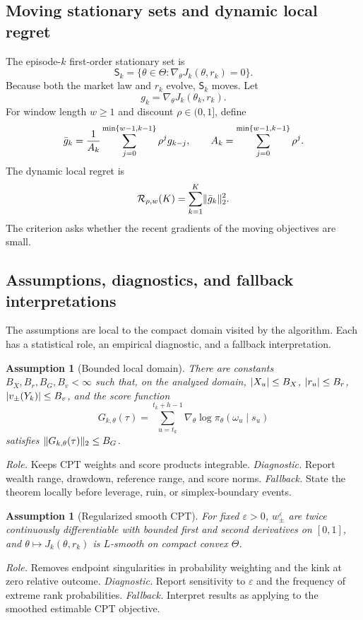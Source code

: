 \documentclass[11pt]{article}
\newtheorem{assumption}[theorem]{Assumption}
\newcommand{\1}{\mathbf 1}
\DeclarePairedDelimiter{\abs}{\lvert}{\rvert}
\DeclarePairedDelimiter{\norm}{\lVert}{\rVert}
\newcommand{\ThetaSet}{\Theta}
\newcommand{\CPT}{\ensuremath{\mathrm{CPT}}\xspace}
\newcommand{\Reg}{\mathcal R}
\newcommand{\Sta}{\mathsf S}
\newcommand{\eps}{\varepsilon}
\begin{document}
\subsection{Moving stationary sets and dynamic local regret}

The episode-$k$ first-order stationary set is
\begin{equation}\label{eq:stationary-set}
 \Sta_k=\{\theta\in\ThetaSet:\nabla_\theta J_k(\theta,r_k)=0\}.
\end{equation}
Because both the market law and $r_k$ evolve, $\Sta_k$ moves.  Let
\[
 g_k=\nabla_\theta J_k(\theta_k,r_k).
\]
For window length $w\ge1$ and discount $\rho\in(0,1]$, define
\begin{equation}\label{eq:smoothed-gradient}
 \bar g_k={1\over A_k}\sum_{j=0}^{\min\{w-1,k-1\}}\rho^j g_{k-j},
 \qquad
 A_k=\sum_{j=0}^{\min\{w-1,k-1\}}\rho^j.
\end{equation}
The dynamic local regret is
\begin{equation}\label{eq:dynamic-regret}
 \Reg_{\rho,w}(K)=\sum_{k=1}^{K}\norm{\bar g_k}_2^2.
\end{equation}
The criterion asks whether the recent gradients of the moving objectives are small.

\subsection{Assumptions, diagnostics, and fallback interpretations}\label{subsec:assumptions}

The assumptions are local to the compact domain visited by the algorithm.  Each has a statistical role, an empirical diagnostic, and a fallback interpretation.

\begin{assumption}[Bounded local domain]\label{ass:bounded}
There are constants $B_X,B_r,B_G,B_v<\infty$ such that, on the analyzed domain, $\abs{X_u}\le B_X$, $\abs{r_u}\le B_r$, $\abs{v_\pm(Y_k)}\le B_v$, and the score function
\[
 G_{k,\theta}(\tau)=\sum_{u=t_k}^{t_k+h-1}\nabla_\theta\log \pi_\theta(\omega_u\mid s_u)
\]
satisfies $\norm{G_{k,\theta}(\tau)}_2\le B_G$.
\end{assumption}
\emph{Role.}  Keeps \CPT weights and score products integrable.  \emph{Diagnostic.}  Report wealth range, drawdown, reference range, and score norms.  \emph{Fallback.}  State the theorem locally before leverage, ruin, or simplex-boundary events.

\begin{assumption}[Regularized smooth \CPT]\label{ass:smooth-cpt}
For fixed $\eps>0$, $w_\pm^\eps$ are twice continuously differentiable with bounded first and second derivatives on $[0,1]$, and $\theta\mapsto J_k(\theta,r_k)$ is $L$-smooth on compact convex $\ThetaSet$.
\end{assumption}
\emph{Role.}  Removes endpoint singularities in probability weighting and the kink at zero relative outcome.  \emph{Diagnostic.}  Report sensitivity to $\eps$ and the frequency of extreme rank probabilities.  \emph{Fallback.}  Interpret results as applying to the smoothed estimable \CPT objective.
\end{document}
